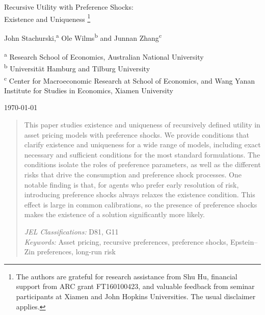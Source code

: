 \documentclass[12pt, reqno]{amsart}
\newcommand\blfootnote[1]{%
  \begingroup
  \renewcommand\thefootnote{}\footnote{#1}%
  \addtocounter{footnote}{-1}%
  \endgroup
}
\newcommand{\1}{\mathbbm 1}
\theoremstyle{plain}
\theoremstyle{definition}
\begin{document}
\title{}




\begin{center}
    \LARGE 
    Recursive Utility with Preference Shocks: \\
    Existence and Uniqueness\blfootnote{The authors are grateful for research
    assistance from Shu Hu, financial support from ARC grant FT160100423, and
valuable feedback from seminar participants at Xiamen and John Hopkins
Universities.  The usual disclaimer applies.}
 
    \vspace{1em}

    \large
    John Stachurski,\textsuperscript{a}
    Ole Wilms\textsuperscript{b} 
    and
    Junnan Zhang\textsuperscript{c} 
    \par \bigskip

    \small
    \textsuperscript{a} Research School of Economics, Australian National University \\
    \textsuperscript{b} Universit\"at Hamburg and Tilburg University  \\
    \textsuperscript{c} Center for Macroeconomic Research at School of
    Economics, and Wang Yanan Institute for Studies in Economics, Xiamen
    University \\ \bigskip

    \normalsize
    \today
\end{center}


\begin{abstract}
    This paper studies existence and uniqueness
    of recursively defined utility in asset pricing models with preference shocks. We
    provide conditions that clarify existence and uniqueness for a wide range of models,
    including exact necessary and sufficient conditions
    for the most standard formulations.  The conditions isolate the roles of preference
    parameters, as well as the different risks that drive the
    consumption and preference shock processes. One notable finding is that,
    for agents who prefer early resolution of risk, introducing preference shocks
    always relaxes the existence condition. This effect is 
    large in common calibrations, so the presence of preference shocks makes
    the existence of a solution significantly more likely. \vspace{1em}

    \noindent
    \textit{JEL Classifications:} D81, G11 \\
    \textit{Keywords:} Asset pricing, recursive preferences, preference shocks, Epstein--Zin preferences, long-run risk
\end{abstract}
\end{document}
